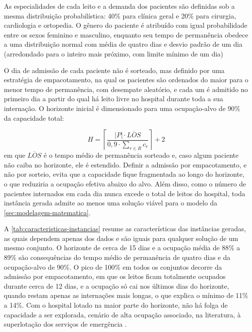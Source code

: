 As especialidades de cada leito e a demanda dos pacientes são definidas sob a mesma distribuição probabilística: 40\% para clínica geral e 20\% para cirurgia, cardiologia e ortopedia. O gênero do paciente é atribuído com igual probabilidade entre os sexos feminino e masculino, enquanto seu tempo de permanência obedece a uma distribuição normal com média de quatro dias e desvio padrão de um dia (arredondado para o inteiro mais próximo, com limite mínimo de um dia)

O dia de admissão de cada paciente não é sorteado, mas definido por uma estratégia de empacotamento, na qual os pacientes são ordenados do maior para o menor tempo de permanência, com desempate aleatório, e cada um é admitido no primeiro dia a partir do qual há leito livre no hospital durante toda a sua internação. O horizonte inicial é dimensionado para uma ocupação-alvo de 90\% da capacidade total:

\begin{equation}
H = \left\lceil \frac{|P| \cdot \overline{LOS}}{0{,}9 \cdot \sum_{r \in R} c_r} \right\rceil + 2
\end{equation}
em que $\overline{LOS}$ é o tempo médio de permanência sorteado e, caso algum paciente não caiba no horizonte, ele é estendido. Definir a admissão por empacotamento, e não por sorteio, evita que a capacidade fique fragmentada ao longo do horizonte, o que reduziria a ocupação efetiva abaixo do alvo. Além disso, como o número de pacientes internados em cada dia nunca excede o total de leitos do hospital, toda instância gerada admite ao menos uma solução viável para o modelo da \autoref{sec:modelagem-matematica}.

A \autoref{tab:caracteristicas-instancias} resume as características das instâncias geradas, as quais dependem apenas dos dados e são iguais para qualquer solução de um mesmo conjunto. O horizonte de cerca de 15 dias e a ocupação média de 88\% a 89\% são consequências do tempo médio de permanência de quatro dias e da ocupação-alvo de 90\%. O pico de 100\% em todos os conjuntos decorre da admissão por empacotamento, em que os leitos ficam totalmente ocupados durante cerca de 12 dias, e a ocupação só cai nos últimos dias do horizonte, quando restam apenas as internações mais longas, o que explica o mínimo de 11\% a 14\%. Com o hospital lotado na maior parte do horizonte, não há folga de capacidade a ser explorada, cenário de alta ocupação associado, na literatura, à superlotação dos serviços de emergência \cite{brandeau2004operations, he2019systematic}.

